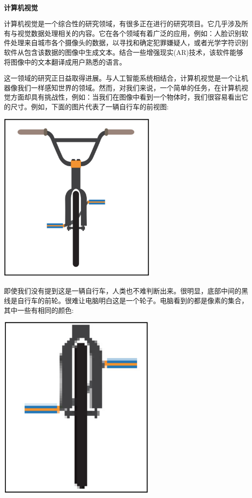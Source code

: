 \noindent\textbf{}\ \par
\textbf{计算机视觉} \ \par
计算机视觉是一个综合性的研究领域，有很多正在进行的研究项目。它几乎涉及所有与视觉数据处理相关的内容。它在各个领域有着广泛的应用，例如：人脸识别软件处理来自城市各个摄像头的数据，以寻找和确定犯罪嫌疑人，或者光学字符识别软件从包含该数据的图像中生成文本。结合一些增强现实(AR)技术，该软件能够将图像中的文本翻译成用户熟悉的语言。 \par
这一领域的研究正日益取得进展。与人工智能系统相结合，计算机视觉是一个让机器像我们一样感知世界的领域。然而，对我们来说，一个简单的任务，在计算机视觉方面却具有挑战性，例如：当我们在图像中看到一个物体时，我们很容易看出它的尺寸。例如，下面的图片代表了一辆自行车的前视图: \par

\begin{center}
	\includegraphics[width=0.6\textwidth]{content/Section-3/Chapter-15/2}
\end{center}

即使我们没有提到这是一辆自行车，人类也不难判断出来。很明显，底部中间的黑线是自行车的前轮。很难让电脑明白这是一个轮子。电脑看到的都是像素的集合，其中一些有相同的颜色: \par

\begin{center}
	\includegraphics[width=0.6\textwidth]{content/Section-3/Chapter-15/3}
\end{center}

